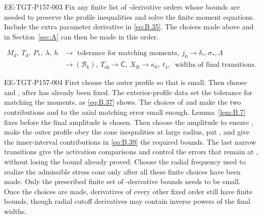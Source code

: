 \begin{remark}\label{rem:B.9}
\begin{EESegment}{EE-TGT-P157-003}
Fix any finite list of -derivative orders whose bounds are needed to preserve
the profile inequalities and solve the finite moment equations. Include the extra parameter
derivative in \eqref{eq:B.35}. The choices made above and in Section~\ref{sec:A} can then be made in this order.
\end{EESegment}
\begin{equation}
\begin{aligned}
 M_d,\ T_d,\ P_*,\ \lambda,\ h
 &\longrightarrow \text{ tolerance for matching moments},\ j_0
 \longrightarrow \delta_*,\sigma_*,\Lambda\\
 &\longrightarrow (\mathcal B_k),\ T_{\mathrm{sh}}
 \longrightarrow \mathsf C,\ X_R
 \longrightarrow \kappa_0,\ t_1,\ \text{ widths of final transitions}.
\end{aligned}
\tag{B.40}\label{eq:B.40}
\end{equation}
\begin{EESegment}{EE-TGT-P157-004}
First choose the outer profile so that
 is small. Then choose
 and
, after  has already been fixed. The exterior-profile data set the tolerance for matching the moments, as \eqref{eq:B.37} shows. The choices of  and  make the two contributions
 and  to the
axial matching error small enough. Lemma~\ref{lem:B.7} fixes  before the final amplitude is chosen. Then
choose the amplitude to ensure
, make the outer profile obey the cone inequalities at
large radius, put , and give the inner-interval contributions in \eqref{eq:B.39} the required bounds.
The last narrow transitions give the activation comparisons and control the errors that remain at
, without losing the bound already proved. Choose the radial frequency used to realize the admissible stress cone only after all these finite choices have been made. Only the prescribed finite set of -derivative bounds needs to be small. Once the choices are made, derivatives of every other
fixed order still have finite bounds, though radial cutoff derivatives may
contain inverse powers of the final widths.
\end{EESegment}
\end{remark}

